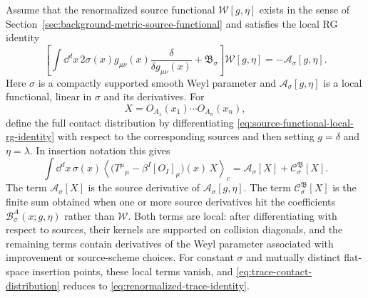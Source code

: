 \begin{proposition}
\label{prop:trace-identity-contact-distribution}
Assume that the renormalized source functional
\(\mathcal W[g,\eta]\) exists in the sense of
Section~\ref{sec:background-metric-source-functional} and satisfies the local
RG identity
\begin{equation}
  \left[
    \int\dd^d x\,2\sigma(x)g_{\mu\nu}(x)
    \frac{\delta}{\delta g_{\mu\nu}(x)}
    +
    \mathfrak B_\sigma
  \right]\mathcal W[g,\eta]
  =
  -\mathcal A_\sigma[g,\eta].
  \label{eq:source-functional-local-rg-identity}
\end{equation}
Here \(\sigma\) is a compactly supported smooth Weyl parameter and
\(\mathcal A_\sigma[g,\eta]\) is a local functional, linear in \(\sigma\) and
its derivatives.  For
\[
  X=O_{A_1}(x_1)\cdots O_{A_n}(x_n),
\]
define the full contact distribution by differentiating
\eqref{eq:source-functional-local-rg-identity} with respect to the corresponding
sources and then setting \(g=\delta\) and \(\eta=\lambda\).  In insertion
notation this gives
\begin{equation}
  \int\dd^d x\,\sigma(x)
  \left\langle
    \bigl(T^\mu{}_\mu-\beta^I[O_I]_\mu\bigr)(x)\,X
  \right\rangle_{\!c}
  =
  \mathcal A_\sigma[X]+\mathcal C_\sigma^{\mathfrak B}[X].
  \label{eq:trace-contact-distribution}
\end{equation}
The term \(\mathcal A_\sigma[X]\) is the source derivative of
\(\mathcal A_\sigma[g,\eta]\).  The term
\(\mathcal C_\sigma^{\mathfrak B}[X]\) is the finite sum obtained when one or
more source derivatives hit the coefficients
\(\mathcal B_\sigma^A(x;g,\eta)\) rather than \(\mathcal W\).  Both terms are
local: after differentiating with respect to sources, their kernels are
supported on collision diagonals, and the remaining terms contain derivatives
of the Weyl parameter associated with improvement or source-scheme choices.
For constant \(\sigma\) and mutually distinct flat-space insertion points,
these local terms vanish, and \eqref{eq:trace-contact-distribution} reduces to
\eqref{eq:renormalized-trace-identity}.
\end{proposition}

